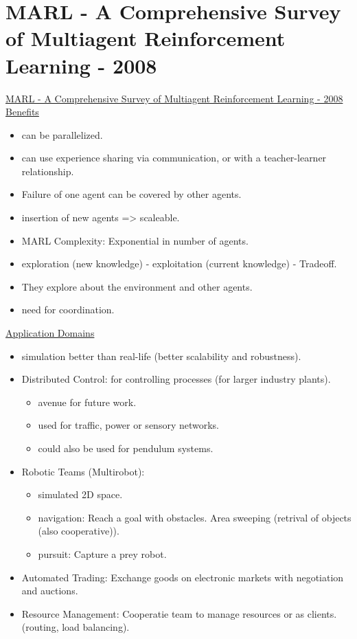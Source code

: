 \section{MARL - A Comprehensive Survey of Multiagent Reinforcement Learning - 2008}
\href{https://ieeexplore.ieee.org/abstract/document/4445757}{MARL - A Comprehensive Survey of Multiagent Reinforcement Learning - 2008}
\underline{Benefits}
\begin{itemize}[noitemsep,nolistsep]
	\item can be parallelized.
	\item can use experience sharing via communication, or with a teacher-learner relationship.
	\item Failure of one agent can be covered by other agents.
	\item insertion of new agents => scaleable.
	\item MARL Complexity: Exponential in number of agents.
	\item exploration (new knowledge) - exploitation (current knowledge) - Tradeoff.
	\item They explore about the environment and other agents.
	\item need for coordination.
\end{itemize}
\underline{Application Domains}
\begin{itemize}[noitemsep,nolistsep]
	\item simulation better than real-life (better scalability and robustness).
	\item Distributed Control: for controlling processes (for larger industry plants).
	\begin{itemize}[noitemsep,nolistsep]
		\item avenue for future work.
		\item used for traffic, power or sensory networks.
		\item could also be used for pendulum systems.
	\end{itemize}
	\item Robotic Teams (Multirobot):
	\begin{itemize}[noitemsep,nolistsep]
		\item simulated 2D space. 
		\item navigation: Reach a goal with obstacles. Area sweeping (retrival of objects (also cooperative)).
		\item pursuit: Capture a prey robot.
	\end{itemize}
	\item Automated Trading: Exchange goods on electronic markets with negotiation and auctions.
	\item Resource Management: Cooperatie team to manage resources or as clients. (routing, load balancing).
\end{itemize}

